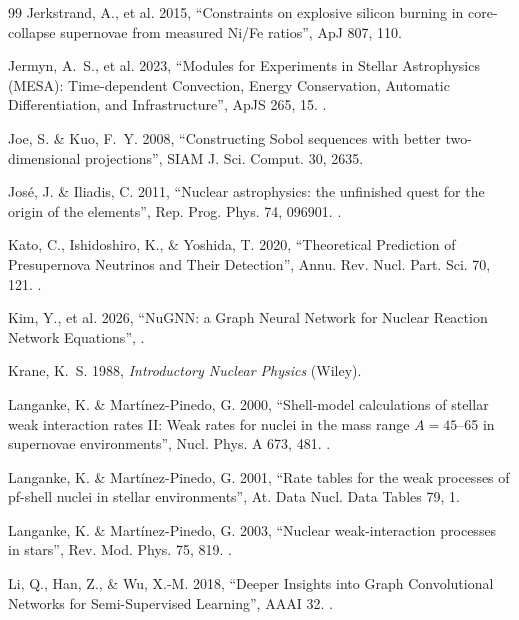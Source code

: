 \begin{thebibliography}{99}
Jerkstrand, A., et al. 2015, ``Constraints on explosive silicon burning in
core-collapse supernovae from measured Ni/Fe ratios'', ApJ 807, 110.

Jermyn, A.~S., et al. 2023, ``Modules for Experiments in Stellar Astrophysics
(MESA): Time-dependent Convection, Energy Conservation, Automatic
Differentiation, and Infrastructure'', ApJS 265, 15. .

Joe, S. \& Kuo, F.~Y. 2008, ``Constructing Sobol sequences with better
two-dimensional projections'', SIAM J. Sci. Comput. 30, 2635.

José, J. \& Iliadis, C. 2011, ``Nuclear astrophysics: the unfinished quest for
the origin of the elements'', Rep. Prog. Phys. 74, 096901. .

Kato, C., Ishidoshiro, K., \& Yoshida, T. 2020, ``Theoretical Prediction of
Presupernova Neutrinos and Their Detection'', Annu. Rev. Nucl. Part. Sci. 70,
121. .

Kim, Y., et al. 2026, ``NuGNN: a Graph Neural Network for Nuclear Reaction
Network Equations'', .

Krane, K.~S. 1988, \emph{Introductory Nuclear Physics} (Wiley).

Langanke, K. \& Martínez-Pinedo, G. 2000, ``Shell-model calculations of
stellar weak interaction rates II: Weak rates for nuclei in the mass range
$A = 45$--65 in supernovae environments'', Nucl. Phys. A 673, 481.
.

Langanke, K. \& Martínez-Pinedo, G. 2001, ``Rate tables for the weak processes
of pf-shell nuclei in stellar environments'', At. Data Nucl. Data Tables 79,
1.

Langanke, K. \& Martínez-Pinedo, G. 2003, ``Nuclear weak-interaction processes
in stars'', Rev. Mod. Phys. 75, 819. .

Li, Q., Han, Z., \& Wu, X.-M. 2018, ``Deeper Insights into Graph Convolutional
Networks for Semi-Supervised Learning'', AAAI 32. .


\end{thebibliography}
